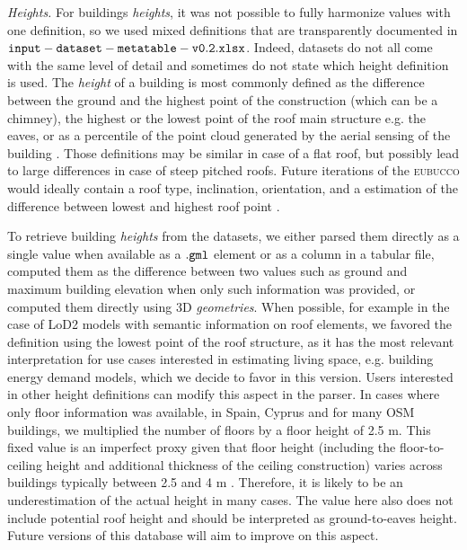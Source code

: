 \documentclass[fleqn,10pt]{wlscirep}
\begin{document}
\medskip \noindent \textit{Heights.} \hspace{0.1cm} For buildings \textit{heights}, it was not possible to fully harmonize values with one definition, so we used mixed definitions that are transparently documented in ${\tt input-dataset-metatable-v0.2.xlsx}$. Indeed, datasets do not all come with the same level of detail and sometimes do not state which height definition is used. The \textit{height} of a building is most commonly defined as the difference between the ground and the highest point of the construction (which can be a chimney), the highest or the lowest point of the roof main structure e.g. the eaves, or as a percentile of the point cloud generated by the aerial sensing of the building \cite{peters2021automated}. Those definitions may be similar in case of a flat roof, but possibly lead to large differences in case of steep pitched roofs. Future iterations of the \textsc{eubucco} would ideally contain a roof type, inclination, orientation, and a estimation of the difference between lowest and highest roof point \cite{zhang2022vectorized}.    

To retrieve building \textit{heights} from the datasets, we either parsed them directly as a single value when available as a $\tt{.gml}$ element or as a column in a tabular file, computed them as the difference between two values such as ground and maximum building elevation when only such information was provided, or computed them directly using 3D \textit{geometries}. When possible, for example in the case of LoD2 models with semantic information on roof elements, we favored the definition using the lowest point of the roof structure, as it has the most relevant interpretation for use cases interested in estimating living space, e.g. building energy demand models, which we decide to favor in this version. Users interested in other height definitions can modify this aspect in the parser. In cases where only floor information was available, in Spain, Cyprus and for many OSM buildings, we multiplied the number of floors by a floor height of 2.5 m. This fixed value is an imperfect proxy given that floor height (including the floor-to-ceiling height and additional thickness of the ceiling construction) varies across buildings typically between 2.5 and 4 m \cite{biljecki2017generating,usui2022comparison}. Therefore, it is likely to be an underestimation of the actual height in many cases. The value here also does not include potential roof height and should be interpreted as ground-to-eaves height. Future versions of this database will aim to improve on this aspect.
\end{document}
